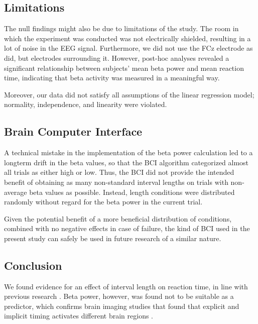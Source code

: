 \documentclass[man,floatsintext]{apa6} %
\begin{document}
\subsection{Limitations}
The null findings might also be due to limitations of the study. The
room in which the experiment was conducted was not electrically
shielded, resulting in a lot of noise in the EEG signal. Furthermore,
we did not use the FCz electrode as  did,
but electrodes surrounding it. However, post-hoc analyses revealed a
significant relationship between subjects' mean beta power and mean
reaction time, indicating that beta activity was measured in a
meaningful way.

Moreover, our data did not satisfy all assumptions of the linear
regression model; normality, independence, and linearity were
violated.

\subsection{Brain Computer Interface}
A technical mistake in the implementation of the beta power
calculation led to a longterm drift in the beta values, so that the
BCI algorithm categorized almost all trials as either high or
low. Thus, the BCI did not provide the intended benefit of obtaining
as many non-standard interval lengths on trials with non-average beta
values as possible. Instead, length conditions were distributed
randomly without regard for the beta power in the current trial.

Given the potential benefit of a more beneficial distribution of
conditions, combined with no negative effects in case of failure, the
kind of BCI used in the present study can safely be used in future
research of a similar nature.

\subsection{Conclusion}
We found evidence for an effect of interval length on reaction time,
in line with previous research \cite{naatanen_diminishing_1970,
  karlin_reaction_1959, drazin_effects_1961,
  grosjean_timing_2001}. Beta power, however, was found not to be
suitable as a predictor, which confirms brain imaging studies that
found that explicit and implicit timing activates different brain
regions \cite{coull_dissociating_2008}.


\end{document}
